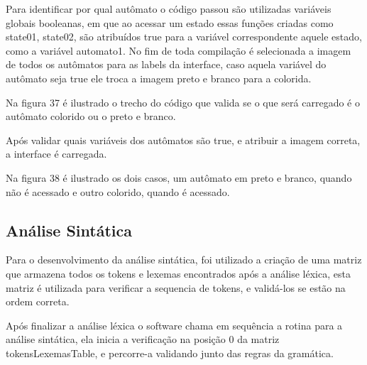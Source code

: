 \documentclass[12pt,oneside,a4paper,chapter=TITLE,section=TITLE,sumario=tradicional]{abntex2}
\begin{document}
\begin{figure}[htb]
\end{figure} 

Para identificar por qual autômato o código passou são utilizadas variáveis globais booleanas, em que ao acessar um estado essas funções criadas como state01, state02, são atribuídos true para a variável correspondente aquele estado, como a variável automato1. No fim de toda compilação é selecionada a imagem de todos os autômatos para as labels da interface, caso aquela variável do autômato seja true ele troca a imagem preto e branco para a colorida.  

Na figura 37 é ilustrado o trecho do código que valida se o que será carregado é o autômato colorido ou o preto e branco. 

\begin{figure}[htb]
\end{figure} 

Após validar quais variáveis dos autômatos são true, e atribuir a imagem correta, a interface é carregada. 

Na figura 38 é ilustrado os dois casos, um autômato em preto e branco, quando não é acessado e outro colorido, quando é acessado. 

\begin{figure}[htb]
\end{figure} 

\subsection{Análise Sintática}
\label{subsec:analisesintatica}

Para o desenvolvimento da análise sintática, foi utilizado a criação de uma matriz que armazena todos os tokens e lexemas encontrados após a análise léxica, esta matriz é utilizada para verificar a sequencia de tokens, e validá-los se estão na ordem correta.  

Após finalizar a análise léxica o software chama em sequência a rotina para a análise sintática, ela inicia a verificação na posição 0 da matriz tokensLexemasTable, e percorre-a validando junto das regras da gramática.  
\end{document}
